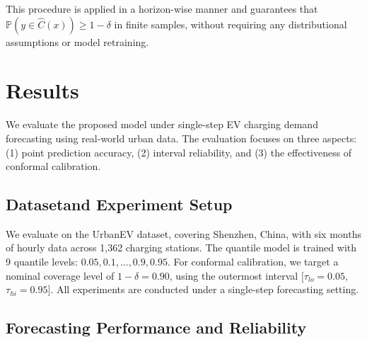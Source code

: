 \documentclass[conference]{IEEEtran}
\begin{document}
This procedure is applied in a horizon-wise manner and guarantees that $\mathbb{P}\left( y \in \hat{C}(x) \right) \ge 1 - \delta$ in finite samples, without requiring any distributional assumptions or model retraining.





\section{Results}



We evaluate the proposed model under single-step EV charging demand forecasting using real-world urban data. The evaluation focuses on three aspects: (1) point prediction accuracy, (2) interval reliability, and (3) the effectiveness of conformal calibration.


\subsection{Datasetand Experiment Setup}

We evaluate on the UrbanEV dataset, covering Shenzhen, China, with six months of hourly data across 1,362 charging stations. The quantile model is trained with 9 quantile levels: $ { 0.05, 0.1, ..., 0.9, 0.95 } $. For conformal calibration, we target a nominal coverage level of $1 - \delta = 0.90$, using the outermost interval $[\tau_{lo} = 0.05$, $ \tau_{hi} = 0.95]$. All experiments are conducted under a single-step forecasting setting.


\subsection{Forecasting Performance and Reliability}
\end{document}
